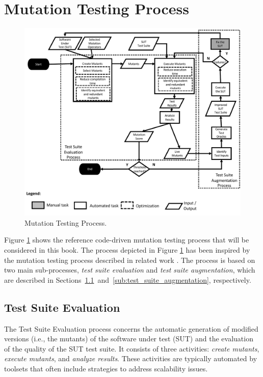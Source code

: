 
\section{Mutation Testing Process}
\label{sec:process}

	\begin{figure}
	\centering
		\includegraphics[width=\textwidth]{images/process}
		\caption{Mutation Testing Process.}
		\label{fig:code:process}
	\end{figure}

Figure \ref{fig:code:process} shows the reference code-driven mutation testing process that will be considered in this book. The process depicted in Figure \ref{fig:code:process} has been inspired by the mutation testing process described in related work \cite{offutt2001mutation,papadakis2019mutation}. The process is based on two main sub-processes, \emph{test suite evaluation} and \emph{test suite augmentation}, which are described in Sections~\ref{sub:test_suite_evaluation}~and~\ref{sub:test_suite_augmentation}, respectively.


\subsection{Test Suite Evaluation} %
\label{sub:test_suite_evaluation}

The Test Suite Evaluation process concerns the automatic generation of modified versions (i.e., the mutants) of the software under test (SUT) and the evaluation of the quality of the SUT test suite. It consists of three activities: \emph{create mutants}, \emph{execute mutants}, and \emph{analyze results}. 
These activities are typically automated by toolsets that often include strategies to address scalability issues. 

